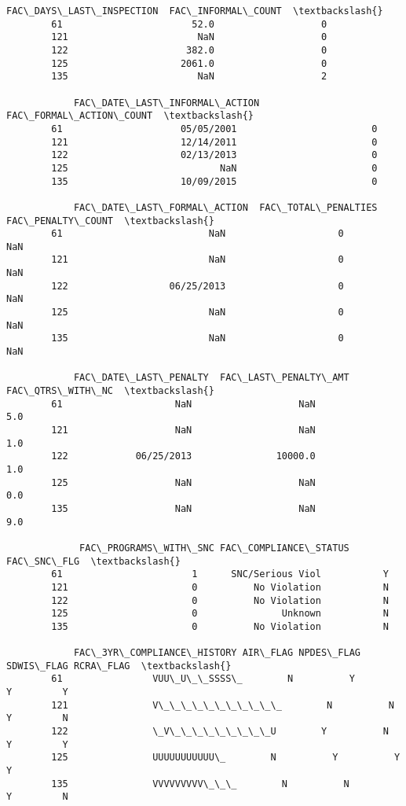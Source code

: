 \documentclass[11pt]{article}
\begin{document}
\begin{Verbatim}[commandchars=\\\{\}]
             FAC\_DAYS\_LAST\_INSPECTION  FAC\_INFORMAL\_COUNT  \textbackslash{}
        61                       52.0                   0   
        121                       NaN                   0   
        122                     382.0                   0   
        125                    2061.0                   0   
        135                       NaN                   2   
        
            FAC\_DATE\_LAST\_INFORMAL\_ACTION  FAC\_FORMAL\_ACTION\_COUNT  \textbackslash{}
        61                     05/05/2001                        0   
        121                    12/14/2011                        0   
        122                    02/13/2013                        0   
        125                           NaN                        0   
        135                    10/09/2015                        0   
        
            FAC\_DATE\_LAST\_FORMAL\_ACTION  FAC\_TOTAL\_PENALTIES  FAC\_PENALTY\_COUNT  \textbackslash{}
        61                          NaN                    0                NaN   
        121                         NaN                    0                NaN   
        122                  06/25/2013                    0                NaN   
        125                         NaN                    0                NaN   
        135                         NaN                    0                NaN   
        
            FAC\_DATE\_LAST\_PENALTY  FAC\_LAST\_PENALTY\_AMT  FAC\_QTRS\_WITH\_NC  \textbackslash{}
        61                    NaN                   NaN               5.0   
        121                   NaN                   NaN               1.0   
        122            06/25/2013               10000.0               1.0   
        125                   NaN                   NaN               0.0   
        135                   NaN                   NaN               9.0   
        
             FAC\_PROGRAMS\_WITH\_SNC FAC\_COMPLIANCE\_STATUS FAC\_SNC\_FLG  \textbackslash{}
        61                       1      SNC/Serious Viol           Y   
        121                      0          No Violation           N   
        122                      0          No Violation           N   
        125                      0               Unknown           N   
        135                      0          No Violation           N   
        
            FAC\_3YR\_COMPLIANCE\_HISTORY AIR\_FLAG NPDES\_FLAG SDWIS\_FLAG RCRA\_FLAG  \textbackslash{}
        61                VUU\_U\_\_SSSS\_        N          Y          Y         Y   
        121               V\_\_\_\_\_\_\_\_\_\_\_        N          N          Y         N   
        122               \_V\_\_\_\_\_\_\_\_\_U        Y          N          Y         Y   
        125               UUUUUUUUUUU\_        N          Y          Y         Y   
        135               VVVVVVVVV\_\_\_        N          N          Y         N   
        

\end{Verbatim}
\end{document}
